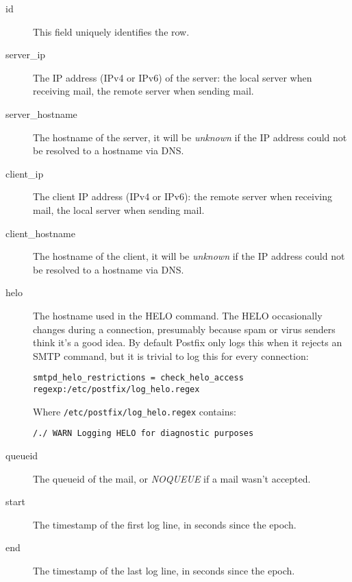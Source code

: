 \documentclass[a4paper,12pt,draft]{article}
\begin{document}
\begin{description}

    \item [id] This field uniquely identifies the row.

    \item [server\_ip] The IP address (IPv4 or IPv6) of the server: the
        local server when receiving mail, the remote server when sending
        mail.

    \item [server\_hostname] The hostname of the server, it will be
        \textit{unknown\/} if the IP address could not be resolved to a
        hostname via DNS\@.

    \item [client\_ip] The client IP address (IPv4 or IPv6): the remote
        server when receiving mail, the local server when sending mail.

    \item [client\_hostname] The hostname of the client, it will be
        \textit{unknown\/} if the IP address could not be resolved to a
        hostname via DNS\@.

    \item [helo] The hostname used in the HELO command.  The HELO
        occasionally changes during a connection, presumably because spam
        or virus senders think it's a good idea.  By default Postfix only
        logs this when it rejects an SMTP command, but it is trivial to log
        this for every connection:

        \texttt{smtpd\_helo\_restrictions = \newline
        \hspace*{2em} check\_helo\_access regexp:/etc/postfix/log\_helo.regex}

        Where \texttt{/etc/postfix/log\_helo.regex} contains:

        \texttt{/./ WARN Logging HELO for diagnostic purposes}

    \item [queueid] The queueid of the mail, or \textit{NOQUEUE\/} if a
        mail wasn't accepted.

    \item [start] The timestamp of the first log line, in seconds since the
        epoch.

    \item [end] The timestamp of the last log line, in seconds since the
        epoch.

\end{description}
\end{document}
